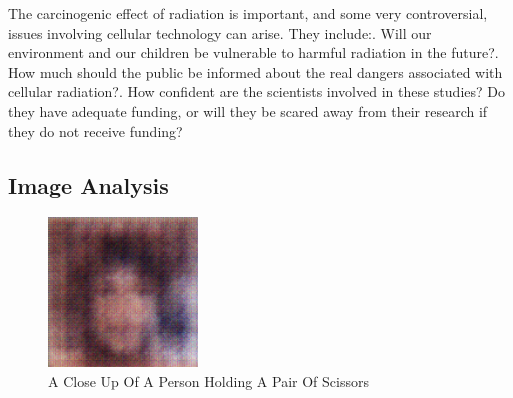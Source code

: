 \documentclass{article}%
\begin{document}
The carcinogenic effect of radiation is important, and some very controversial, issues involving cellular technology can arise. They include:. Will our environment and our children be vulnerable to harmful radiation in the future?. How much should the public be informed about the real dangers associated with cellular radiation?. How confident are the scientists involved in these studies? Do they have adequate funding, or will they be scared away from their research if they do not receive funding?

%
\subsection{Image Analysis}%
\label{subsec:ImageAnalysis}%


\begin{figure}[h!]%
\centering%
\includegraphics[width=150px]{500_fake_images/samples_5_41.png}%
\caption{A Close Up Of A Person Holding A Pair Of Scissors}%
\end{figure}

%
\end{document}

